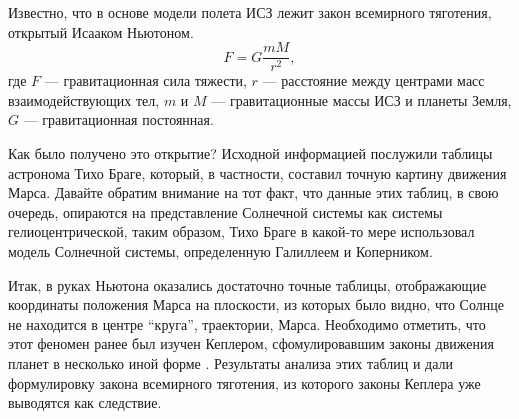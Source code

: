 \documentclass[12pt, openany, twoside]{book} %
\begin{document}
Известно, что в основе модели полета ИСЗ лежит закон всемирного тяготения, открытый Исааком Ньютоном.
\begin{equation}
F = G\frac{mM}{r^2}, \label{newton}
\end{equation}
где $F$ --- гравитационная сила тяжести, $r$ --- расстояние между центрами масс взаимодействующих тел,
$m$ и $M$ --- гравитационные массы ИСЗ и планеты Земля, $G$ --- гравитационная постоянная.

Как было получено это открытие? Исходной информацией послужили таблицы астронома Тихо Браге, который, в частности, составил точную картину движения Марса. Давайте обратим внимание на тот факт, что данные этих таблиц, в свою очередь, опираются на представление Солнечной системы как системы гелиоцентрической, таким образом, Тихо Браге в какой-то мере использовал модель Солнечной системы, определенную Галиллеем и Коперником.

Итак, в руках Ньютона оказались достаточно точные таблицы, отображающие координаты положения Марса на плоскости, из которых было видно, что Солнце не находится в центре ``круга'', траектории, Марса. Необходимо отметить, что этот феномен ранее был изучен Кеплером, сфомулировавшим законы движения планет в несколько иной форме \cite{avanta}. Результаты анализа этих таблиц и дали формулировку закона всемирного тяготения, из которого законы Кеплера уже выводятся как следствие.
\end{document}
